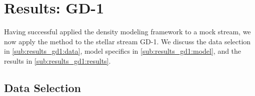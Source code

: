 \documentclass[twocolumn]{aastex631}
\begin{document}
    


\section{Results: GD-1} \label{sec:results_gd1}

    Having successful applied the density modeling framework to a
    mock stream, we now apply the method to the stellar stream GD-1.
    We discuss the data selection in \autoref{sub:results_gd1:data},
    model specifics in \autoref{sub:results_gd1:model},
    and the results in \autoref{sub:results_gd1:results}.

    \subsection{Data Selection} \label{sub:results_gd1:data}
\end{document}
